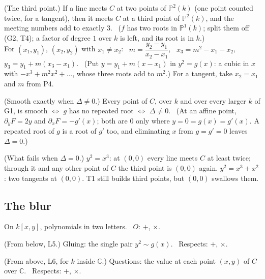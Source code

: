 \begin{lines}
\item[\lab{T1}] (The third point.) If a line meets $C$ at two points of $\mathbb{P}^2(k)$ (one point counted twice, for a tangent), then it meets $C$ at a third point of $\mathbb{P}^2(k)$, and the meeting numbers add to exactly $3$. \ ($f$ has two roots in $\mathbb{P}^1(k)$; split them off (G2, T4); a factor of degree $1$ over $k$ is left, and its root is in $k$.) \\
For $(x_1, y_1)$, $(x_2, y_2)$ with $x_1 \ne x_2$: \ $m = \dfrac{y_2 - y_1}{x_2 - x_1}$, \ $x_3 = m^2 - x_1 - x_2$, \ $y_3 = y_1 + m(x_3 - x_1)$. \ (Put $y = y_1 + m(x - x_1)$ in $y^2 = g(x)$: a cubic in $x$ with $-x^3 + m^2 x^2 + \dots$, whose three roots add to $m^2$.) For a tangent, take $x_2 = x_1$ and $m$ from P4.
\item[\lab{T2}] (Smooth exactly when $\Delta \ne 0$.) Every point of $C$, over $k$ and over every larger $k$ of G1, is smooth $\iff$ $g$ has no repeated root $\iff$ $\Delta \ne 0$. \ (At an affine point, $\partial_y F = 2y$ and $\partial_x F = -g'(x)$; both are $0$ only where $y = 0 = g(x) = g'(x)$. A repeated root of $g$ is a root of $g'$ too, and eliminating $x$ from $g = g' = 0$ leaves $\Delta = 0$.)
\item[\lab{T3}] (What fails when $\Delta = 0$.) $y^2 = x^3$: at $(0, 0)$ every line meets $C$ at least twice; through it and any other point of $C$ the third point is $(0, 0)$ again. $y^2 = x^3 + x^2$: two tangents at $(0, 0)$. T1 still builds third points, but $(0,0)$ swallows them.
\end{lines}

\subsection*{The blur}

On $k[x, y]$, polynomials in two letters. \ $O$: $+$, $\times$.

\begin{lines}
\item[\lab{B1}] (From below, L5.) Gluing: the single pair $y^2 \sim g(x)$. \ Respects: $+$, $\times$.
\item[\lab{B2}] (From above, L6, for $k$ inside $\mathbb{C}$.) Questions: the value at each point $(x, y)$ of $C$ over $\mathbb{C}$. \ Respects: $+$, $\times$.
\end{lines}

